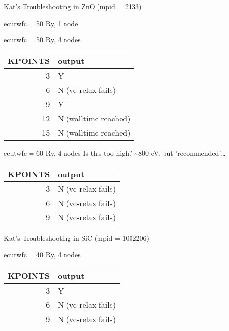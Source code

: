\documentclass[8pt, compress]{beamer}
\begin{document}
\begin{frame}[allowframebreaks]{Kat's Troubleshooting in ZnO (mpid = 2133)}
\begin{block}{ecutwfc = 50 Ry, 1 node}
\end{block}
\begin{block}{ecutwfc = 50 Ry, 4 nodes}
\begin{center}
\begin{tabular}{rl}
KPOINTS & output\\
\hline
3 & Y\\
6 & N (vc-relax fails)\\
9 & Y\\
12 & N (walltime reached)\\
15 & N (walltime reached)\\
\end{tabular}
\end{center}
\end{block}
\begin{block}{ecutwfc = 60 Ry, 4 nodes}
Is this too high? \textasciitilde{}800 eV, but 'recommended'\ldots{}
\begin{center}
\begin{tabular}{rl}
KPOINTS & output\\
\hline
3 & N (vc-relax fails)\\
6 & N (vc-relax fails)\\
9 & N (vc-relax fails)\\
\end{tabular}
\end{center}
\end{block}
\end{frame}
\begin{frame}[allowframebreaks]{Kat's Troubleshooting in SiC (mpid = 1002206)}
\begin{block}{ecutwfc = 40 Ry, 4 nodes}
\begin{center}
\begin{tabular}{rl}
KPOINTS & output\\
\hline
3 & Y\\
6 & N (vc-relax fails)\\
9 & N (vc-relax fails)\\
\end{tabular}
\end{center}
\end{block}
\end{frame}
\end{document}
